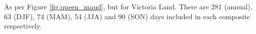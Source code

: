 \label{fig:victoria}
As per Figure \ref{fig:queen_maud}, but for Victoria Land. There are 281 (annual), 63 (DJF), 74 (MAM), 54 (JJA) and 90 (SON) days included in each composite respectively.